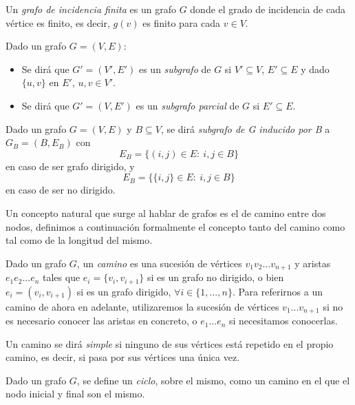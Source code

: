 \begin{definicion}
	Un \textit{grafo de incidencia finita} es un grafo $G$ donde el grado de incidencia de cada vértice es finito, es decir, $g(v)$ es finito para cada $v\in V$.
\end{definicion}

\begin{definicion}
	Dado un grafo $G=(V,E)$: 
	\begin{itemize}
		\item Se dirá que $G'=(V',E')$ es un \textit{subgrafo} de $G$ si $V'\subseteq V$, $E'\subseteq E$ y dado $\{u,v\}$ en $E'$, $u,v\in V'$.
		\item Se dirá que $G'=(V,E')$ es un \textit{subgrafo parcial} de $G$ si $E'\subseteq E$.
	\end{itemize} 
\end{definicion}

\begin{definicion}
	Dado un grafo $G=(V,E)$ y $B\subseteq V$, se dirá \textit{subgrafo de G inducido por B} a $G_B=(B,E_B)$ con
	$$E_B=\{(i,j)\in E:\ i,j\in B\}$$
	en caso de ser grafo dirigido, y
	$$E_B=\{\{i,j\}\in E:\ i,j\in B\}$$
	en caso de ser no dirigido.
\end{definicion}

Un concepto natural que surge al hablar de grafos es el de camino entre dos nodos, definimos a continuación formalmente el concepto tanto del camino como tal como de la longitud del mismo.

\begin{definicion}
	Dado un grafo $G$, un \textit{camino} es una sucesión de vértices $v_1v_2...v_{n+1}$ y aristas $e_1e_2...e_n$ tales que $e_i=\{v_i,v_{i+1}\}$ si es un grafo no dirigido, o bien $e_i=(v_i,v_{i+1})$ si es un grafo dirigido, $\forall i \in \{1,...,n\}$. Para referirnos a un camino de ahora en adelante, utilizaremos la sucesión de vértices $v_1...v_{n+1}$ si no es necesario conocer las aristas en concreto, o $e_1...e_n$ si necesitamos conocerlas.
\end{definicion}

\begin{definicion}
	Un camino se dirá \textit{simple} si ninguno de sus vértices está repetido en el propio camino, es decir, si pasa por sus vértices una única vez.
\end{definicion}

\begin{definicion}
	Dado un grafo $G$, se define un \textit{ciclo}, sobre el mismo, como un camino en el que el nodo inicial y final son el mismo.
\end{definicion}

